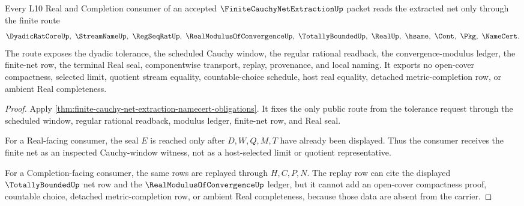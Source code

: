 \begin{theorem}\label{thm:finite-cauchy-net-extraction-l10-route}
Every L10 Real and Completion consumer of an accepted $\FiniteCauchyNetExtractionUp$ packet reads the extracted net only through the finite route
$$
\DyadicRatCoreUp,\ \StreamNameUp,\ \RegSeqRatUp,\ \RealModulusOfConvergenceUp,\ \TotallyBoundedUp,\ \RealUp,\ \hsame,\ \Cont,\ \Pkg,\ \NameCert .
$$
The route exposes the dyadic tolerance, the scheduled Cauchy window, the regular rational readback, the convergence-modulus ledger, the finite-net row, the terminal Real seal, componentwise transport, replay, provenance, and local naming. It exports no open-cover compactness, selected limit, quotient stream equality, countable-choice schedule, host real equality, detached metric-completion row, or ambient Real completeness.
\end{theorem}
\begin{proof}
Apply \autoref{thm:finite-cauchy-net-extraction-namecert-obligations}. It fixes the only public route from the tolerance request through the scheduled window, regular rational readback, modulus ledger, finite-net row, and Real seal.

For a Real-facing consumer, the seal $E$ is reached only after $D,W,Q,M,T$ have already been displayed. Thus the consumer receives the finite net as an inspected Cauchy-window witness, not as a host-selected limit or quotient representative.

For a Completion-facing consumer, the same rows are replayed through $H,C,P,N$. The replay row can cite the displayed $\TotallyBoundedUp$ net row and the $\RealModulusOfConvergenceUp$ ledger, but it cannot add an open-cover compactness proof, countable choice, detached metric-completion row, or ambient Real completeness, because those data are absent from the carrier.
\end{proof}



